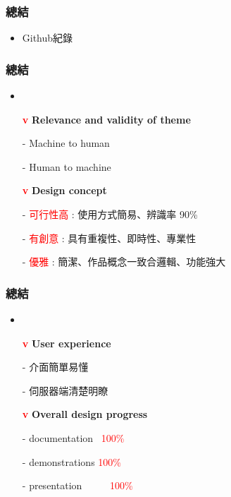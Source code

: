 \documentclass[10pt, conference, compsocconf]{beamer}
\begin{document}
\begin{CJK}{UTF8}{}
\begin{frame}
\frametitle{總結}
\begin{itemize}
\item\Large Github紀錄
\end{itemize}
\end{frame}


\begin{frame}
\frametitle{總結}
\begin{itemize}
\item{}
\end{itemize}
\begin{itemize}
\item[\Large\bf \textcolor{red}v] \Large\bf Relevance and validity of theme
\end{itemize}
\begin{itemize}
\item[-]  Machine to human
\item[-]  Human to machine
\end{itemize}

\begin{itemize}
\item[\Large\bf \textcolor{red}v] \Large\bf Design concept
\end{itemize}
\begin{itemize}
\item[-]  \textcolor{red}{可行性高} : 使用方式簡易、辨識率 90\%
\item[-]  \textcolor{red}{有創意} : 具有重複性、即時性、專業性
\item[-]  \textcolor{red}{優雅} : 簡潔、作品概念一致合邏輯、功能強大
\end{itemize}
\end{frame}

\begin{frame}
\frametitle{總結}
\begin{itemize}
\item{}
\end{itemize}
\begin{itemize}
\item[\Large\bf \textcolor{red}v] \Large\bf User experience
\end{itemize}
\begin{itemize}
\item[-]  介面簡單易懂
\item[-]  伺服器端清楚明瞭
\end{itemize}

\begin{itemize}
\item[\Large\bf \textcolor{red}v] \Large\bf Overall design progress
\end{itemize}
\begin{itemize}
\item[-]  documentation \textcolor{red}{~100\%}
\item[-]  demonstrations \textcolor{red}{100\%}
\item[-]  presentation     \textcolor{red}{~~~~~100\%}
\end{itemize}
\end{frame}


\end{CJK}
\end{document}
